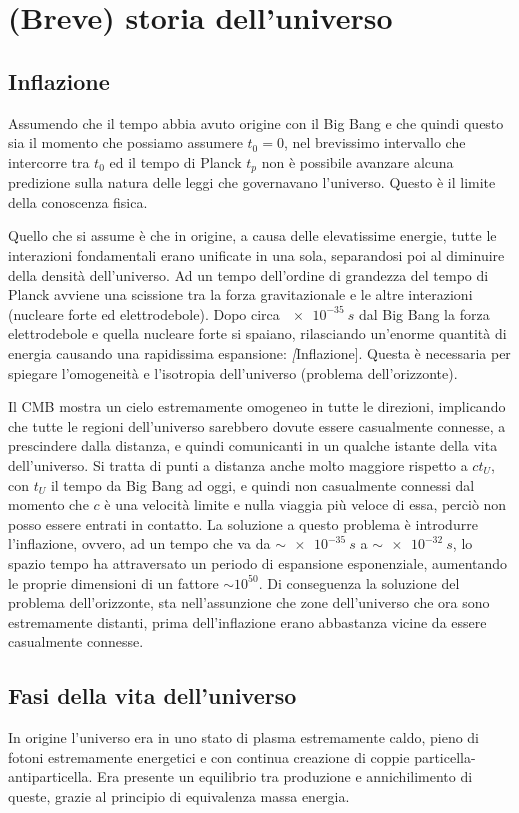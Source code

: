 \section{(Breve) storia dell'universo}\label{sec:storia-universo}
\subsection{Inflazione}\label{inflazione}
Assumendo che il tempo abbia avuto origine con il Big Bang e che quindi questo sia il momento che possiamo assumere $t_0=0$, nel brevissimo intervallo che intercorre tra $t_0$ ed il tempo di Planck $t_p$ non è possibile avanzare alcuna predizione sulla natura delle leggi che governavano l'universo. Questo è il limite della conoscenza fisica.

Quello che si assume è che in origine, a causa delle elevatissime energie, tutte le interazioni fondamentali erano unificate in una sola, separandosi poi al diminuire della densità dell'universo. Ad un tempo dell'ordine di grandezza del tempo di Planck avviene una scissione tra la forza gravitazionale e le altre interazioni (nucleare forte ed elettrodebole). Dopo circa $\SI{e-35}{s}$ dal Big Bang la forza elettrodebole e quella nucleare forte si spaiano, rilasciando un'enorme quantità di energia causando una rapidissima espansione: \textit[Inflazione]. Questa è necessaria per spiegare l'omogeneità e l'isotropia dell'universo (problema dell'orizzonte).

Il CMB mostra un cielo estremamente omogeneo in tutte le direzioni, implicando che tutte le regioni dell'universo sarebbero dovute essere casualmente connesse, a prescindere dalla distanza, e quindi comunicanti in un qualche istante della vita dell'universo. Si tratta di punti a distanza anche molto maggiore rispetto a $ct_U$, con $t_U$ il tempo da Big Bang ad oggi, e quindi non casualmente connessi dal momento che $c$ è una velocità limite e nulla viaggia più veloce di essa, perciò non posso essere entrati in contatto. La soluzione a questo problema è introdurre l'inflazione, ovvero, ad un tempo che va da $\sim \SI{e-35}{s}$ a $\sim \SI{e-32}{s}$, lo spazio tempo ha attraversato un periodo di espansione esponenziale, aumentando le proprie dimensioni di un fattore $\sim 10^{50}$. Di conseguenza la soluzione del problema dell'orizzonte, sta nell'assunzione che zone dell'universo che ora sono estremamente distanti, prima dell'inflazione erano abbastanza vicine da essere casualmente connesse.

\subsection{Fasi della vita dell'universo}\label{sec:fasi-universo}
In origine l'universo era in uno stato di plasma estremamente caldo, pieno di fotoni estremamente energetici e con continua creazione di coppie particella-antiparticella. Era presente un equilibrio tra produzione e annichilimento di queste, grazie al principio di equivalenza massa energia. 

